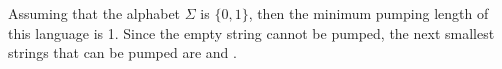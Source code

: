 Assuming that the alphabet $\Sigma$ is $\{\text{0},\text{1}\}$, then the minimum pumping length of this language is 1. Since the empty string cannot be pumped, the next smallest strings that can be pumped are  and .